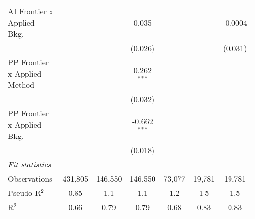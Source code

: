 \begin{tabular}{lcccccc}
   AI Frontier x Applied - Bkg.   &                &                & 0.035          &                &               & -0.0004\\   
                                  &                &                & (0.026)        &                &               & (0.031)\\   
   PP Frontier x Applied - Method &                &                & 0.262$^{***}$  &                &               &   \\   
                                  &                &                & (0.032)        &                &               &   \\   
   PP Frontier x Applied - Bkg.   &                &                & -0.662$^{***}$ &                &               &   \\   
                                  &                &                & (0.018)        &                &               &   \\   
   \midrule
   \emph{Fit statistics}\\
   Observations                   & 431,805        & 146,550        & 146,550        & 73,077         & 19,781        & 19,781\\  
   Pseudo R$^2$                   & 0.85           & 1.1            & 1.1            & 1.2            & 1.5           & 1.5\\  
   R$^2$                          & 0.66           & 0.79           & 0.79           & 0.68           & 0.83          & 0.83\\  
   

\end{tabular}
